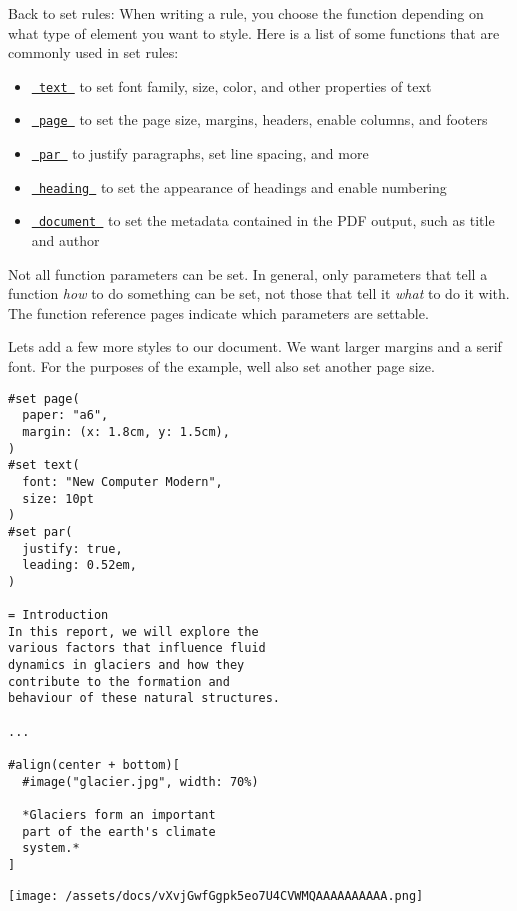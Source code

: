Back to set rules: When writing a rule, you choose the function
depending on what type of element you want to style. Here is a list of
some functions that are commonly used in set rules:

\begin{itemize}
\tightlist
\item
  \href{/docs/reference/text/text/}{\texttt{\ text\ }} to set font
  family, size, color, and other properties of text
\item
  \href{/docs/reference/layout/page/}{\texttt{\ page\ }} to set the page
  size, margins, headers, enable columns, and footers
\item
  \href{/docs/reference/model/par/}{\texttt{\ par\ }} to justify
  paragraphs, set line spacing, and more
\item
  \href{/docs/reference/model/heading/}{\texttt{\ heading\ }} to set the
  appearance of headings and enable numbering
\item
  \href{/docs/reference/model/document/}{\texttt{\ document\ }} to set
  the metadata contained in the PDF output, such as title and author
\end{itemize}

Not all function parameters can be set. In general, only parameters that
tell a function \emph{how} to do something can be set, not those that
tell it \emph{what} to do it with. The function reference pages indicate
which parameters are settable.

Let\textquotesingle s add a few more styles to our document. We want
larger margins and a serif font. For the purposes of the example,
we\textquotesingle ll also set another page size.

\begin{verbatim}
#set page(
  paper: "a6",
  margin: (x: 1.8cm, y: 1.5cm),
)
#set text(
  font: "New Computer Modern",
  size: 10pt
)
#set par(
  justify: true,
  leading: 0.52em,
)

= Introduction
In this report, we will explore the
various factors that influence fluid
dynamics in glaciers and how they
contribute to the formation and
behaviour of these natural structures.

...

#align(center + bottom)[
  #image("glacier.jpg", width: 70%)

  *Glaciers form an important
  part of the earth's climate
  system.*
]
\end{verbatim}

\texttt{[image: /assets/docs/vXvjGwfGgpk5eo7U4CVWMQAAAAAAAAAA.png]}

